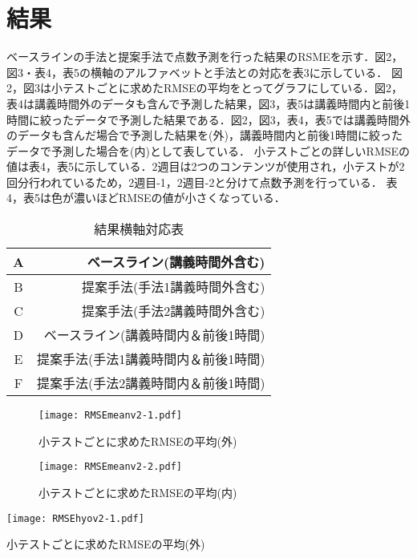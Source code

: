 \documentclass[a4j]{jarticle}
\begin{document}
\section{結果}

ベースラインの手法と提案手法で点数予測を行った結果のRSMEを示す．図2，図3・表4，表5の横軸のアルファベットと手法との対応を表3に示している．
図2，図3は小テストごとに求めたRMSEの平均をとってグラフにしている．図2，表4は講義時間外のデータも含んで予測した結果，図3，表5は講義時間内と前後1時間に絞ったデータで予測した結果である．図2，図3，表4，表5では講義時間外のデータも含んだ場合で予測した結果を(外)，講義時間内と前後1時間に絞ったデータで予測した場合を(内)として表している．
小テストごとの詳しいRMSEの値は表4，表5に示している．2週目は2つのコンテンツが使用され，小テストが2回分行われているため，2週目-1，2週目-2と分けて点数予測を行っている．
表4，表5は色が濃いほどRMSEの値が小さくなっている．


\begin{table}[h]
  \centering
  \begin{tabular}{c|r}
    \hline
    A & ベースライン(講義時間外含む) \\ \hline
    B & 提案手法(手法1講義時間外含む) \\ \hline
    C & 提案手法(手法2講義時間外含む) \\ \hline
    D & ベースライン(講義時間内＆前後1時間) \\ \hline
    E & 提案手法(手法1講義時間内＆前後1時間) \\ \hline
    F & 提案手法(手法2講義時間内＆前後1時間) \\ \hline
  \end{tabular}
  \caption{結果横軸対応表}
  \label{tb:結果横軸対応表}
\end{table}


\begin{figure}[h]
  \centering
  \texttt{[image: RMSEmeanv2-1.pdf]}
  \caption{小テストごとに求めたRMSEの平均(外)}
  \label{fig:小テストごとに求めたRMSEの平均(外)}
\end{figure}

\begin{figure}[h]
  \centering
  \texttt{[image: RMSEmeanv2-2.pdf]}
  \caption{小テストごとに求めたRMSEの平均(内)}
  \label{fig:小テストごとに求めたRMSEの平均(内)}
\end{figure}

\begin{table}[h]
  \centering
  \texttt{[image: RMSEhyov2-1.pdf]}
  \caption{小テストごとに求めたRMSEの平均(外)}
  \label{tb:小テストごとのRMSE(外)}
\end{table}
\end{document}
